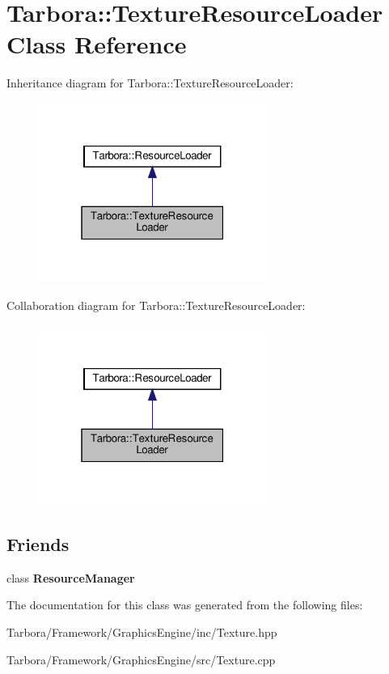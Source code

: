 \hypertarget{classTarbora_1_1TextureResourceLoader}{}\section{Tarbora\+:\+:Texture\+Resource\+Loader Class Reference}
\label{classTarbora_1_1TextureResourceLoader}


Inheritance diagram for Tarbora\+:\+:Texture\+Resource\+Loader\+:\nopagebreak
\begin{figure}[H]
\begin{center}
\leavevmode
\includegraphics[width=211pt]{classTarbora_1_1TextureResourceLoader__inherit__graph}
\end{center}
\end{figure}


Collaboration diagram for Tarbora\+:\+:Texture\+Resource\+Loader\+:\nopagebreak
\begin{figure}[H]
\begin{center}
\leavevmode
\includegraphics[width=211pt]{classTarbora_1_1TextureResourceLoader__coll__graph}
\end{center}
\end{figure}
\subsection*{Friends}
\begin{DoxyCompactItemize}
\item 
\mbox{\label{classTarbora_1_1TextureResourceLoader_a54c1252abc87a78a301e6b6984470408}} 
class {\bfseries Resource\+Manager}
\end{DoxyCompactItemize}


The documentation for this class was generated from the following files\+:\begin{DoxyCompactItemize}
\item 
Tarbora/\+Framework/\+Graphics\+Engine/inc/Texture.\+hpp\item 
Tarbora/\+Framework/\+Graphics\+Engine/src/Texture.\+cpp\end{DoxyCompactItemize}
